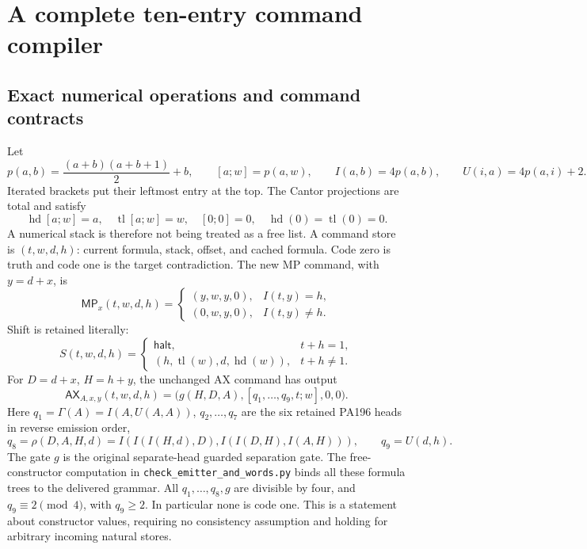 \section{A complete ten-entry command compiler}
\label{sec:np-controller}

\subsection{Exact numerical operations and command contracts}

Let
\[
 p(a,b)=\frac{(a+b)(a+b+1)}2+b,\qquad [a;w]=p(a,w),\qquad
 I(a,b)=4p(a,b),\qquad U(i,a)=4p(a,i)+2.
\]
Iterated brackets put their leftmost entry at the top. The Cantor
projections are total and satisfy
\[
 \operatorname{hd}[a;w]=a,\quad \operatorname{tl}[a;w]=w,
 \quad[0;0]=0,\quad\operatorname{hd}(0)=\operatorname{tl}(0)=0.
\]
A numerical stack is therefore not being treated as a free list.
A command store is $(t,w,d,h)$: current formula, stack, offset, and cached
formula. Code zero is truth and code one is the target contradiction.
The new MP command, with $y=d+x$, is
\begin{equation}\label{eq:np-mp}
 \mathsf{MP}_x(t,w,d,h)=
 \begin{cases}
 (y,w,y,0),& I(t,y)=h,\\
 (0,w,y,0),& I(t,y)\ne h.
 \end{cases}
\end{equation}
Shift is retained literally:
\begin{equation}\label{eq:np-shift}
 S(t,w,d,h)=
 \begin{cases}
 \mathsf{halt},&t+h=1,\\
 (h,\operatorname{tl}(w),d,\operatorname{hd}(w)),&t+h\ne1.
 \end{cases}
\end{equation}
For $D=d+x$, $H=h+y$, the unchanged AX command has output
\begin{equation}\label{eq:np-ax}
 \mathsf{AX}_{A,x,y}(t,w,d,h)
   =\bigl(g(H,D,A),[q_1,\ldots,q_9,t;w],0,0\bigr).
\end{equation}
Here $q_1=\Gamma(A)=I(A,U(A,A))$, $q_2,\ldots,q_7$ are the
six retained PA196 heads in reverse emission order,
\[
 q_8=\rho(D,A,H,d)=I(I(I(H,d),D),I(I(D,H),I(A,H))),
 \qquad q_9=U(d,h).
\]
The gate $g$ is the original separate-head guarded separation gate.
The free-constructor computation in
\texttt{check\_emitter\_and\_words.py} binds all these formula trees to
the delivered grammar. All $q_1,\ldots,q_8,g$ are divisible by four,
and $q_9\equiv2\pmod4$, with $q_9\ge2$. In particular none is code one.
This is a statement about constructor values, requiring no consistency
assumption and holding for arbitrary incoming natural stores.

